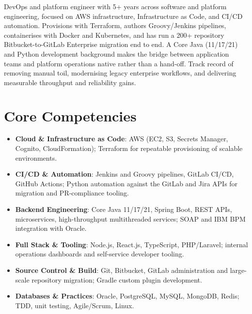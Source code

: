 \documentclass[11pt,a4paper,sans]{moderncv}
\begin{document}
\makecvtitle


\vspace{6pt}
\small{DevOps and platform engineer with 5+ years across software and platform engineering, focused on AWS infrastructure, Infrastructure as Code, and CI/CD automation. Provisions with Terraform, authors Groovy/Jenkins pipelines, containerises with Docker and Kubernetes, and has run a 200+ repository Bitbucket-to-GitLab Enterprise migration end to end. A Core Java (11/17/21) and Python development background makes the bridge between application teams and platform operations native rather than a hand-off. Track record of removing manual toil, modernising legacy enterprise workflows, and delivering measurable throughput and reliability gains.}


\section{Core Competencies}
\vspace{1pt}
\begin{itemize}

\item \textbf{Cloud \& Infrastructure as Code}: AWS (EC2, S3, Secrets Manager, Cognito, CloudFormation); Terraform for repeatable provisioning of scalable environments.

\item \textbf{CI/CD \& Automation}: Jenkins and Groovy pipelines, GitLab CI/CD, GitHub Actions; Python automation against the GitLab and Jira APIs for migration and PR-compliance tooling.

\item \textbf{Backend Engineering}: Core Java 11/17/21, Spring Boot, REST APIs, microservices, high-throughput multithreaded services; SOAP and IBM BPM integration with Oracle.

\item \textbf{Full Stack \& Tooling}: Node.js, React.js, TypeScript, PHP/Laravel; internal operations dashboards and self-service developer tooling.

\item \textbf{Source Control \& Build}: Git, Bitbucket, GitLab administration and large-scale repository migration; Gradle custom plugin development.

\item \textbf{Databases \& Practices}: Oracle, PostgreSQL, MySQL, MongoDB, Redis; TDD, unit testing, Agile/Scrum, Linux.

\end{itemize}
\end{document}
